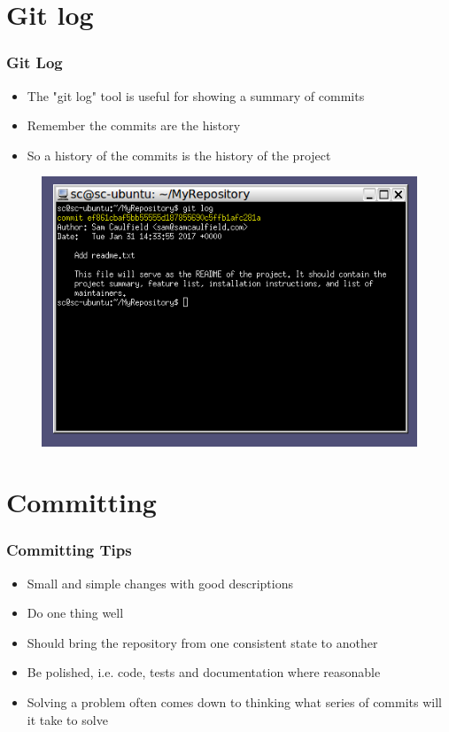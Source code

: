 \documentclass{beamer}
\begin{document}
\section{Git log}
\begin{frame}
\frametitle{Git Log}
\begin{itemize}
\item The "git log" tool is useful for showing a summary of commits
\item Remember the commits are the history
\item So a history of the commits is the history of the project
\end{itemize}
\begin{figure}
\includegraphics[scale=0.5]{gitlog0}
\end{figure}
\end{frame}

\section{Committing}
\begin{frame}
\frametitle{Committing Tips}
\begin{itemize}
\item Small and simple changes with good descriptions
\item Do one thing well
\item Should bring the repository from one consistent state to another
\item Be polished, i.e. code, tests and documentation where reasonable
\item Solving a problem often comes down to thinking what series of commits will it take to solve
\end{itemize}
\end{frame}
\end{document}
